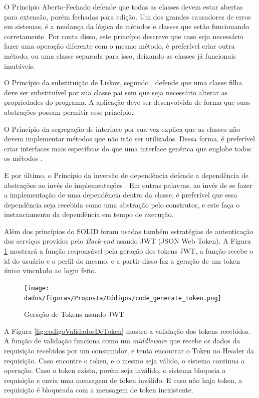 O Princípio Aberto-Fechado defende que todas as classes devem estar abertas para extensão, porém fechadas para edição. Um dos grandes causadores de erros em sistemas, é a mudança da lógica de métodos e classes que estão funcionando corretamente. Por conta disso, este princípio descreve que caso seja necessário fazer uma operação diferente com o mesmo método, é preferível criar outra método, ou uma classe separada para isso, deixando as classes já funcionais imutáveis.

O Princípio da substituição de Liskov, segundo \cite{paixao2020__solid}, defende que uma classe filha deve ser substituível por sua classe pai sem que seja necessário alterar as propriedades do programa. A aplicação deve ser desenvolvida de forma que suas abstrações possam permitir esse princípio.

O Princípio da segregação de interface por sua vez explica que as classes não devem implementar métodos que não irão ser utilizados. Dessa forma, é preferível criar interfaces mais específicas do que uma interface genérica que englobe todos os métodos \cite{paixao2020__solid}.

E por último, o Princípio da inversão de dependência defende a dependência de abstrações ao invés de implementações \cite{paixao2020__solid}. Em outras palavras, ao invés de se fazer a implementação de uma dependência dentro da classe, é preferível que essa dependência seja recebida como uma abstração pelo construtor, e este faça o instanciamento da dependência em tempo de execução.

Além dos princípios do SOLID foram usadas também estratégias de autenticação dos serviços providos pelo \textit{Back-end} usando JWT (JSON Web Token). A Figura \ref{fig:codigoGeradorDeToken} mostrará a função responsável pela geração dos tokens JWT, a função recebe o id do usuário e o perfil do mesmo, e a partir disso faz a geração de um token único vinculado ao login feito.

\begin{figure}[H]
    \centering
    \texttt{[image: dados/figuras/Proposta/Códigos/code\_generate\_token.png]}
    \caption{Geração de Tokens usando JWT}
    \label{fig:codigoGeradorDeToken}
\end{figure}

A Figura \ref{fig:codigoValidadorDeToken} mostra a validação dos tokens recebidos. A função de validação funciona como um \textit{middleware} que recebe os dados da requisição recebidos por um consumidor, e tenta encontrar o Token no Header da requisição. Caso encontre o token, e o mesmo seja válido, o sistema continua a operação. Caso o token exista, porém seja inválido, o sistema bloqueia a requisição e envia uma mensagem de token inválido. E caso não haja token, a requisição é bloqueada com a mensagem de token inexistente.

